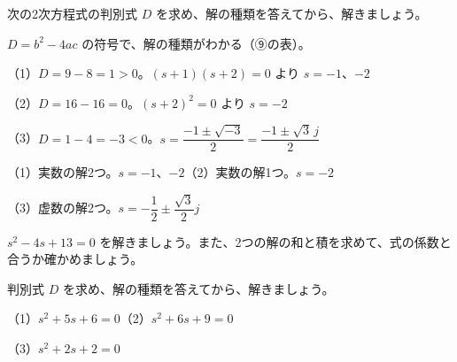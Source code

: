 \begin{reidai}
次の2次方程式の判別式 $D$ を求め、解の種類を答えてから、解きましょう。\par
\noindent {}\par
\kangaekata $D=b^2-4ac$ の符号で、解の種類がわかる（⑨の表）。\par
\shiki{}\zw{} （1）$D=9-8=1>0$。$(s+1)(s+2)=0$ より $s=-1$、$-2$\par
\bkviiq （2）$D=16-16=0$。$(s+2)^2=0$ より $s=-2$\par
\bkviiq （3）$D=1-4=-3<0$。$s=\dfrac{-1\pm\sqrt{-3}}{2}=\dfrac{-1\pm\sqrt3\,j}{2}$\par
\kotae{}\zw{} （1）実数の解2つ。$s=-1$、$-2$\quad（2）実数の解1つ。$s=-2$\par
\bkviiq （3）虚数の解2つ。$s=-\dfrac{1}{2}\pm\dfrac{\sqrt3}{2}j$
\end{reidai}

\noindent\begin{minipage}[t]{0.485\linewidth}\vspace{0pt}
\begin{jibun}
$s^2-4s+13=0$ を解きましょう。また、2つの解の和と積を求めて、式の係数と合うか確かめましょう。
\end{jibun}
\end{minipage}\hfill
\begin{minipage}[t]{0.485\linewidth}\vspace{0pt}
\begin{jibun}
判別式 $D$ を求め、解の種類を答えてから、解きましょう。\par
（1）$s^2+5s+6=0$\newline（2）$s^2+6s+9=0$\par
（3）$s^2+2s+2=0$
\end{jibun}
\end{minipage}

